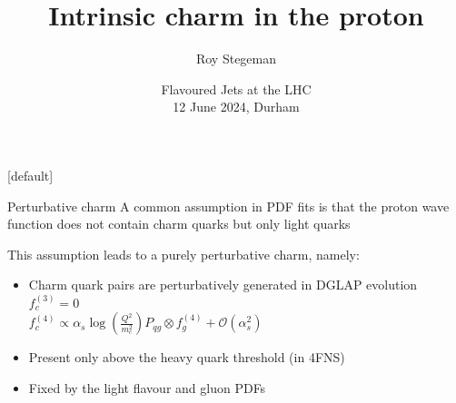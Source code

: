 \documentclass[aspectratio=43, 8pt,t]{beamer}
\title{Intrinsic charm in the proton}
\date{Flavoured Jets at the LHC  \\[0.1cm] 12 June 2024, Durham}
\author{Roy Stegeman}
\institute{\small The University of Edinburgh}
\begin{document}
{
\begin{frame}
  \titlepage
\end{frame}
}

[default]



\newcommand{\nn}{\vspace*{1em}}










\begin{frame}{Perturbative charm}
  A common assumption in PDF fits is that the proton wave function does not contain charm quarks but only light quarks

  \vspace*{1em}
  This assumption leads to a purely perturbative charm, namely:
  \begin{itemize}
    \item Charm quark pairs are perturbatively generated in DGLAP evolution\\
    $f_c^{(3)}=0$ \\
    $f_c^{(4)}\propto \alpha_s \log\left(\frac{Q^2}{m_c^2}\right)P_{qg} \otimes f_g^{(4)} + \mathcal{O}(\alpha_s^2)$

    \item Present only above the heavy quark threshold (in 4FNS)

    \item Fixed by the light flavour and gluon PDFs
  \end{itemize}

  \vspace*{1em}
\end{frame}
\end{document}
